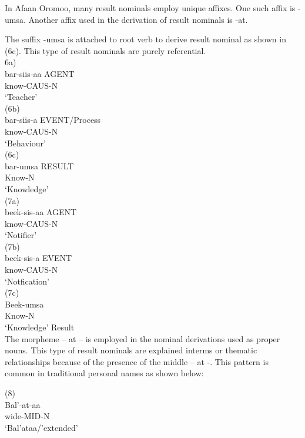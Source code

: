 \documentclass[11pt,a4paper]{article}
\begin{document}
In Afaan Oromoo, many result nominals employ unique affixes. One such affix is -umsa. Another affix used in the derivation of result nominals is -at.  

The suffix -umsa is attached to root verb to derive result nominal as shown in (6c). This type of result nominals are purely referential. \\

6a) \\
\indent bar-siis-aa AGENT\\
\indent know-CAUS-N\\
\indent ‘Teacher’\\

(6b) \\
\indent bar-siis-a EVENT/Process\\
\indent know-CAUS-N\\
\indent ‘Behaviour’\\

(6c)\\
\indent bar-umsa RESULT\\
\indent Know-N\\
\indent ‘Knowledge’\\


(7a) \\
\indent beek-sis-aa AGENT\\
\indent know-CAUS-N\\
\indent ‘Notifier’\\

(7b)\\
\indent beek-sis-a EVENT\\
\indent know-CAUS-N\\
\indent ‘Notfication’\\

(7c)\\
\indent Beek-umsa\\
\indent Know-N\\
\indent ‘Knowledge’ Result\\

The morpheme – at – is employed in the nominal derivations used as proper nouns.  This type of result nominals are explained interms or thematic relationships because  of the presence of the middle – at -. This pattern is common in traditional personal names as shown below:

(8)\\
\indent Bal’-at-aa\\
\indent wide-MID-N\\
\indent ‘Bal’ataa/’extended’\\
\end{document}
